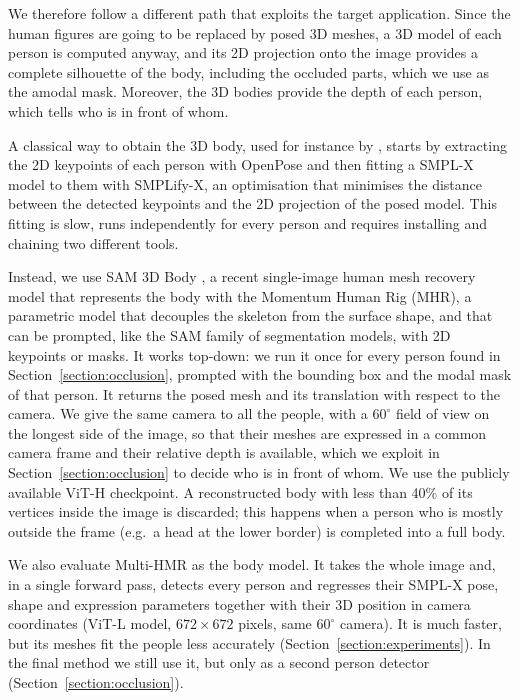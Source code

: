 \documentclass[pdflatex,sn-mathphys-num]{sn-jnl}%
\begin{document}
We therefore follow a different path that exploits the target application. Since the human figures are going to be replaced by posed 3D meshes, a 3D model of each person is computed anyway, and its 2D projection onto the image provides a complete silhouette of the body, including the occluded parts, which we use as the amodal mask. Moreover, the 3D bodies provide the depth of each person, which tells who is in front of whom.

A classical way to obtain the 3D body, used for instance by \citet{tous2023}, starts by extracting the 2D keypoints of each person with OpenPose \citep{Openpose} and then fitting a SMPL-X model \citep{SMPL-X:2019} to them with SMPLify-X, an optimisation that minimises the distance between the detected keypoints and the 2D projection of the posed model. This fitting is slow, runs independently for every person and requires installing and chaining two different tools.

Instead, we use SAM 3D Body \citep{yang2026sam3dbody}, a recent single-image human mesh recovery model that represents the body with the Momentum Human Rig (MHR), a parametric model that decouples the skeleton from the surface shape, and that can be prompted, like the SAM family of segmentation models, with 2D keypoints or masks. It works top-down: we run it once for every person found in Section~\ref{section:occlusion}, prompted with the bounding box and the modal mask of that person. It returns the posed mesh and its translation with respect to the camera. We give the same camera to all the people, with a $60^\circ$ field of view on the longest side of the image, so that their meshes are expressed in a common camera frame and their relative depth is available, which we exploit in Section~\ref{section:occlusion} to decide who is in front of whom. We use the publicly available ViT-H checkpoint. A reconstructed body with less than 40\% of its vertices inside the image is discarded; this happens when a person who is mostly outside the frame (e.g.\ a head at the lower border) is completed into a full body.

We also evaluate Multi-HMR \citep{baradel2024multihmr} as the body model. It takes the whole image and, in a single forward pass, detects every person and regresses their SMPL-X pose, shape and expression parameters together with their 3D position in camera coordinates (ViT-L model, $672\times672$ pixels, same $60^\circ$ camera). It is much faster, but its meshes fit the people less accurately (Section~\ref{section:experiments}). In the final method we still use it, but only as a second person detector (Section~\ref{section:occlusion}).
\end{document}
